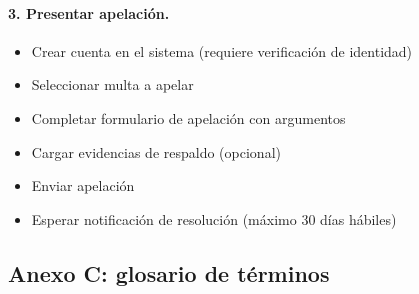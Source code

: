 \paragraph{3. Presentar apelación.}
\begin{itemize}
    \item Crear cuenta en el sistema (requiere verificación de identidad)
    \item Seleccionar multa a apelar
    \item Completar formulario de apelación con argumentos
    \item Cargar evidencias de respaldo (opcional)
    \item Enviar apelación
    \item Esperar notificación de resolución (máximo 30 días hábiles)
\end{itemize}

\subsection{Anexo C: glosario de términos}


